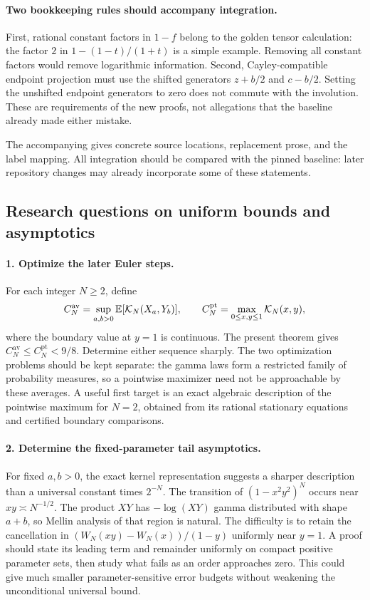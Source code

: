 \paragraph{Two bookkeeping rules should accompany integration.}
First, rational constant factors in $1-f$ belong to the golden tensor
calculation: the factor $2$ in $1-(1-t)/(1+t)$ is a simple example.
Removing all constant factors would remove logarithmic information.
Second, Cayley-compatible endpoint projection must use the shifted
generators $z+b/2$ and $c-b/2$. Setting the unshifted endpoint
generators to zero does not commute with the involution. These are
requirements of the new proofs, not allegations that the baseline
already made either mistake.

The accompanying  gives concrete
source locations, replacement prose, and the label mapping. All
integration should be compared with the pinned baseline: later
repository changes may already incorporate some of these statements.

\subsection{Research questions on uniform bounds and asymptotics}

\paragraph{1. Optimize the later Euler steps.}
For each integer $N\ge2$, define
\[
 C_N^{\mathrm{av}}=
 \sup_{a,b>0}\mathbb E[\mathcal K_N(X_a,Y_b)],\qquad
 C_N^{\mathrm{pt}}=
 \max_{0\le x,y\le1}\mathcal K_N(x,y),
\]
where the boundary value at $y=1$ is continuous. The present theorem
gives $C_N^{\mathrm{av}}\le C_N^{\mathrm{pt}}<9/8$. Determine either
sequence sharply. The two optimization problems should be kept
separate: the gamma laws form a restricted family of probability
measures, so a pointwise maximizer need not be approachable by these
averages. A useful first target is an exact algebraic description of
the pointwise maximum for $N=2$, obtained from its rational stationary
equations and certified boundary comparisons.

\paragraph{2. Determine the fixed-parameter tail asymptotics.}
For fixed $a,b>0$, the exact kernel representation suggests a sharper
description than a universal constant times $2^{-N}$. The transition
of $(1-x^2y^2)^N$ occurs near $xy\asymp N^{-1/2}$. The product
$XY$ has $-\log(XY)$ gamma distributed with shape $a+b$, so Mellin
analysis of that region is natural. The difficulty is to retain the
cancellation in $(W_N(xy)-W_N(x))/(1-y)$ uniformly near $y=1$.
A proof should state its leading term and remainder uniformly on
compact positive parameter sets, then study what fails as an order
approaches zero. This could give much smaller parameter-sensitive
error budgets without weakening the unconditional universal bound.

